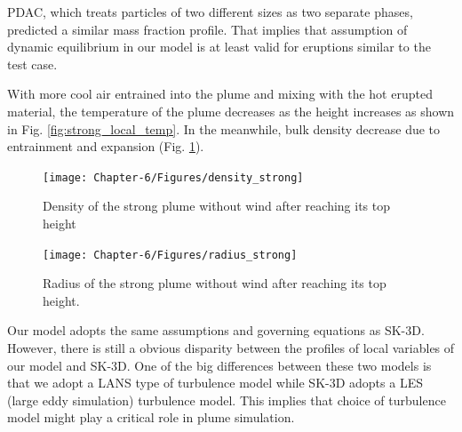 PDAC, which treats particles of two different sizes as two separate phases, predicted a similar mass fraction profile. That implies that assumption of dynamic equilibrium in our model is at least valid for eruptions similar to the test case.

With more cool air entrained into the plume and mixing with the hot erupted material, the temperature of the plume decreases as the height increases as shown in Fig. \ref{fig:strong_local_temp}. In the meanwhile, bulk density decrease due to entrainment and expansion (Fig. \ref{fig:strong_local_density}).
\begin{figure}
\center
\texttt{[image: Chapter-6/Figures/density\_strong]}
\caption{Density of the strong plume without wind after reaching its top height}
\label{fig:strong_local_density}
\end{figure}
\begin{figure}
\center
\texttt{[image: Chapter-6/Figures/radius\_strong]}
\caption{Radius of the strong plume without wind after reaching its top height.}
\label{fig:strong_local_radius}
\end{figure}
Our model adopts the same assumptions and governing equations as SK-3D. However, there is still a obvious disparity between the profiles of local variables of our model and SK-3D. One of the big differences between these two models is that we adopt a LANS type of turbulence model while SK-3D adopts a LES (large eddy simulation) turbulence model. This implies that choice of turbulence model might play a critical role in plume simulation.


